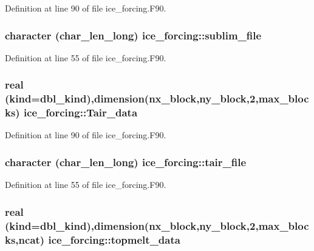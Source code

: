 Definition at line 90 of file ice\_\-forcing.F90.\hypertarget{namespaceice__forcing_a91c5310add7d3da3da2f948d150844ca}{
\subsubsection[{sublim\_\-file}]{\setlength{\rightskip}{0pt plus 5cm}character (char\_\-len\_\-long) {\bf ice\_\-forcing::sublim\_\-file}}}
\label{namespaceice__forcing_a91c5310add7d3da3da2f948d150844ca}


Definition at line 55 of file ice\_\-forcing.F90.\hypertarget{namespaceice__forcing_ad7ad20c7d13ff53a459e4f18b8eeccbf}{
\subsubsection[{Tair\_\-data}]{\setlength{\rightskip}{0pt plus 5cm}real (kind=dbl\_\-kind),dimension(nx\_\-block,ny\_\-block,2,max\_\-blocks) {\bf ice\_\-forcing::Tair\_\-data}}}
\label{namespaceice__forcing_ad7ad20c7d13ff53a459e4f18b8eeccbf}


Definition at line 90 of file ice\_\-forcing.F90.\hypertarget{namespaceice__forcing_ab4ce88faae0d80e903bc827b71109573}{
\subsubsection[{tair\_\-file}]{\setlength{\rightskip}{0pt plus 5cm}character (char\_\-len\_\-long) {\bf ice\_\-forcing::tair\_\-file}}}
\label{namespaceice__forcing_ab4ce88faae0d80e903bc827b71109573}


Definition at line 55 of file ice\_\-forcing.F90.\hypertarget{namespaceice__forcing_a76dd37d14a04398b8cddb3930e86f682}{
\subsubsection[{topmelt\_\-data}]{\setlength{\rightskip}{0pt plus 5cm}real (kind=dbl\_\-kind),dimension(nx\_\-block,ny\_\-block,2,max\_\-blocks,ncat) {\bf ice\_\-forcing::topmelt\_\-data}}}
\label{namespaceice__forcing_a76dd37d14a04398b8cddb3930e86f682}


